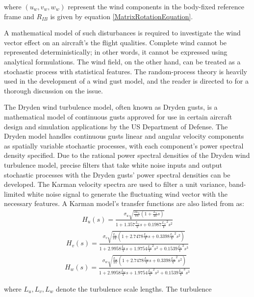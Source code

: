 \documentclass[twocolumn,showpacs,
    nofootinbib,aps,superscriptaddress,
    eqsecnum,prd,showkeys,10pt,floatfix]{revtex4}
\begin{document}
\par
where ${(u_w, v_w, w_w)}$ represent the wind components in the body-fixed
reference frame and $R_{IB}$ is given by equation
    {\ref{MatrixRotationEquation}}.
\par
A mathematical model of such disturbances is required to investigate the wind
vector effect on an aircraft's the flight qualities. Complete wind cannot be
represented deterministically; in other words, it cannot be expressed using
analytical formulations. The wind field, on the other hand, can be treated as a
stochastic process with statistical features. The random-process theory is
heavily used in the development of a wind gust model, and the reader is
directed to {\cite{Gust}} for a thorough discussion on the issue.
\par
The Dryden wind turbulence model, often known as Dryden gusts, is a
mathematical model of continuous gusts approved for use in certain aircraft
design and simulation applications by the US Department of Defense.
    {\cite{Field_Path_Following_for_Miniature_Air_vehicles}} The Dryden model
handles continuous gusts linear and angular velocity components as spatially
variable stochastic processes, with each component's power spectral density
specified. Due to the rational power spectral densities of the Dryden wind
turbulence model, precise filters that take white noise inputs and output
stochastic processes with the Dryden gusts' power spectral densities can be
developed. The Karman velocity spectra are used to filter a unit variance,
band-limited white noise signal to generate the fluctuating wind vector with
the necessary features. A Karman model's transfer functions are also listed
from {\cite{Karman}} as:
\begin{align}
    H_u(s)=\frac{\sigma_u\sqrt{\frac{2L_u}{\pi V}(1+\frac{L_u}{4V}s)}}{1+1.357\frac{L_u}{V}s+0.1987{\frac{L_u}{V}}^2s^2}
\end{align}
\begin{align}
    H_v(s)=\frac{\sigma_v\sqrt{\frac{L_v}{\pi V}(1+2.7478\frac{L_u}{V}s+0.3398{\frac{L_v}{V}}^2s^2)}}{1+2.9958\frac{L_v}{V}s+1.9754{\frac{L_v}{V}}^2s^2+0.1539{\frac{L_v}{V}}^3s^3}
\end{align}
\begin{align}
    H_w(s)=\frac{\sigma_w\sqrt{\frac{L_w}{\pi V}(1+2.7478\frac{L_w}{V}s+0.3398{\frac{L_w}{V}}^2s^2)}}{1+2.9958\frac{L_w}{V}s+1.9754{\frac{L_w}{V}}^2s^2+0.1539{\frac{L_w}{V}}^3s^3}
\end{align}
\par
where $L_u, L_v, L_w$ denote the turbulence scale lengths. The turbulence
\end{document}
